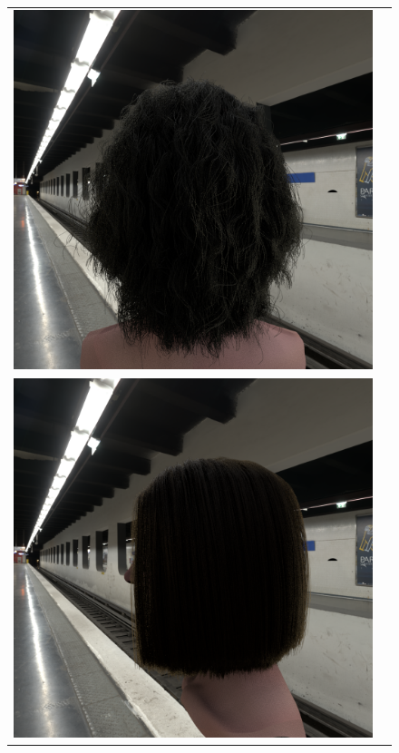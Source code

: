 \documentclass[11pt,a4paper]{report}
\begin{document}
\begin{figure}[h]
\begin{center}
\begin{tabular}{cc}
\includegraphics[scale=0.16]{realworld/subway/uniform_black1_32.png} \\
\includegraphics[scale=0.16]{realworld/subway/deon_brown2_32.png} &

\end{tabular}
\end{center}
\end{figure}
\end{document}

